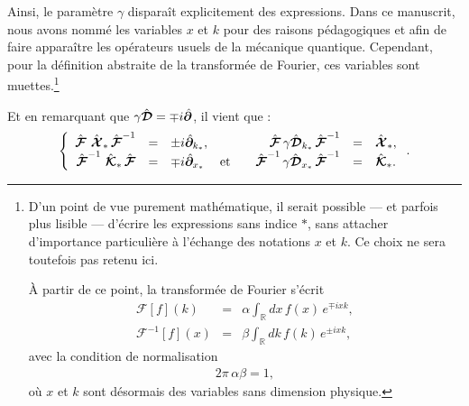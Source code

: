 Ainsi, le paramètre $\gamma$ disparaît explicitement des expressions.
Dans ce manuscrit, nous avons nommé les variables \guillemotleft$x$\guillemotright{} et 
\guillemotleft$k$\guillemotright{} pour des raisons pédagogiques et afin de faire apparaître 
les opérateurs usuels de la mécanique quantique. 
Cependant, pour la définition abstraite de la transformée de Fourier, ces variables sont muettes.\footnote{D’un point de vue purement mathématique, il serait possible — et parfois plus lisible — d’écrire les expressions sans indice \guillemotleft$\ast$\guillemotright{}, sans attacher d’importance particulière à l’échange des notations $x$ et $k$. Ce choix ne sera toutefois pas retenu ici.

\medskip

À partir de ce point, la transformée de Fourier s’écrit
\begin{eqnarray}
    \mathcal F[f](k) 
    &=& \alpha \int_{\mathbb R} d x\, f(x)\, e^{\mp i x k}, \\
    \mathcal F^{-1}[f](x) 
    &=& \beta \int_{\mathbb R} d k\, f(k)\, e^{\pm i x k},
\end{eqnarray}
avec la condition de normalisation
\begin{eqnarray}
    2\pi\, \alpha \beta = 1,
\end{eqnarray}
où $x$ et $k$ sont désormais des variables sans dimension physique.}

\smallskip 

Et en remarquant que $\gamma \hat{\bm{\mathcal D}} = \mp i \hat{\bm{\partial}}$, il vient que :
\begin{eqnarray}
    \left \{ 
        \begin{array}{rclcrlc}  
            \hat{\bm{\mathcal F}} \, \,  \hat{\bm{\mathcal X}}_\ast \, \hat{\bm{\mathcal{F}}}^{-1} &  =  &\pm i \hat{\bm{\partial}}_{k_\ast}, &&\hat{\bm{\mathcal{F}}}\, \gamma \hat{\bm{\mathcal{D}}}_{k_\ast} \, \hat{\bm{\mathcal{F}}}^{-1} &= &  \hat{\bm{\mathcal X}}_\ast, \\  \hat{\bm{\mathcal{F}}}^{-1} \, \,  \hat{\bm{\mathcal{K}}}_\ast  \, \hat{\bm{\mathcal{F}}}  & =  & \mp i \hat{\bm{\partial}}_{x_\ast}  &\mbox{et} &  \quad   \hat{\bm{\mathcal{F}}}^{-1}\, \gamma \hat{\bm{\mathcal D}}_{x_\ast}\, \hat{\bm{\mathcal{F}}}^{-1} & =&  \hat{\bm{\mathcal{K}}}_\ast .
        \end{array} 
        \right . .
\end{eqnarray}






